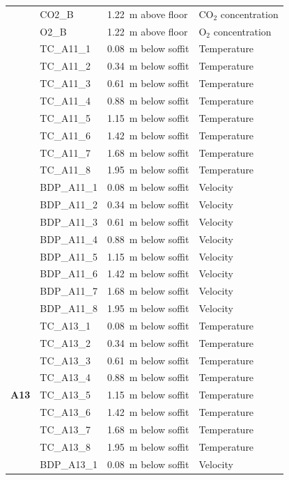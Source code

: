 \documentclass[12pt,oneside]{book}
\begin{document}
\begin{longtable}[c]{c|lll}
 & CO2\_B     & 1.22~m above floor   & CO$_2$ concentration \\
 & O2\_B      & 1.22~m above floor   & O$_2$ concentration \\
\bottomrule
\newpage
\multirow{16}{*}{\large{\textbf{A11}}}
 & TC\_A11\_1  & 0.08~m below soffit  & Temperature \\
 & TC\_A11\_2  & 0.34~m below soffit  & Temperature \\
 & TC\_A11\_3  & 0.61~m below soffit  & Temperature \\
 & TC\_A11\_4  & 0.88~m below soffit  & Temperature \\
 & TC\_A11\_5  & 1.15~m below soffit  & Temperature \\
 & TC\_A11\_6  & 1.42~m below soffit  & Temperature \\
 & TC\_A11\_7  & 1.68~m below soffit  & Temperature \\
 & TC\_A11\_8  & 1.95~m below soffit  & Temperature \\
\cline{2-4}
 & BDP\_A11\_1 & 0.08~m below soffit  & Velocity \\
 & BDP\_A11\_2 & 0.34~m below soffit  & Velocity \\
 & BDP\_A11\_3 & 0.61~m below soffit  & Velocity \\
 & BDP\_A11\_4 & 0.88~m below soffit  & Velocity \\
 & BDP\_A11\_5 & 1.15~m below soffit  & Velocity \\
 & BDP\_A11\_6 & 1.42~m below soffit  & Velocity \\
 & BDP\_A11\_7 & 1.68~m below soffit  & Velocity \\
 & BDP\_A11\_8 & 1.95~m below soffit  & Velocity \\
\midrule
\multirow{16}{*}{\large{\textbf{A13}}}
 & TC\_A13\_1  & 0.08~m below soffit  & Temperature \\
 & TC\_A13\_2  & 0.34~m below soffit  & Temperature \\
 & TC\_A13\_3  & 0.61~m below soffit  & Temperature \\
 & TC\_A13\_4  & 0.88~m below soffit  & Temperature \\
 & TC\_A13\_5  & 1.15~m below soffit  & Temperature \\
 & TC\_A13\_6  & 1.42~m below soffit  & Temperature \\
 & TC\_A13\_7  & 1.68~m below soffit  & Temperature \\
 & TC\_A13\_8  & 1.95~m below soffit  & Temperature \\
\cline{2-4}
 & BDP\_A13\_1 & 0.08~m below soffit  & Velocity \\

\end{longtable}
\end{document}

